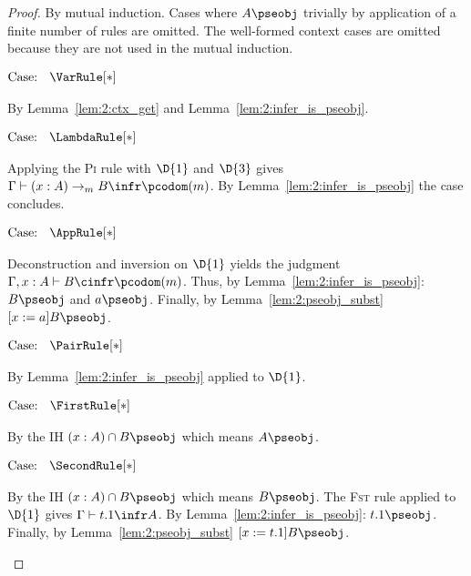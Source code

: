 \begin{proof}
    By mutual induction.
    Cases where $A\pseobj$ trivially by application of a finite number of rules are omitted.
    The well-formed context cases are omitted because they are not used in the mutual induction.

    $\text{Case: }\begin{array}{c} \VarRule[*] \end{array}$
    \begin{proofcase}
        By Lemma~\ref{lem:2:ctx_get} and Lemma~\ref{lem:2:infer_is_pseobj}.
    \end{proofcase}

    $\text{Case: }\begin{array}{c} \LambdaRule[*] \end{array}$
    \begin{proofcase}
        Applying the \textsc{Pi} rule with $\D{1}$ and $\D{3}$ gives $\Gamma \vdash (x : A) \to_m B \infr \pcodom(m)$.
        By Lemma~\ref{lem:2:infer_is_pseobj} the case concludes.
    \end{proofcase}

    $\text{Case: }\begin{array}{c} \AppRule[*] \end{array}$
    \begin{proofcase}
        Deconstruction and inversion on $\D{1}$ yields the judgment $\Gamma, x : A \vdash B \cinfr \pcodom(m)$.
        Thus, by Lemma~\ref{lem:2:infer_is_pseobj}: $B\pseobj$ and $a\pseobj$.
        Finally, by Lemma~\ref{lem:2:pseobj_subst} $[x := a]B\pseobj$.
    \end{proofcase}

    $\text{Case: }\begin{array}{c} \PairRule[*] \end{array}$
    \begin{proofcase}
        By Lemma~\ref{lem:2:infer_is_pseobj} applied to $\D{1}$.
    \end{proofcase}

    $\text{Case: }\begin{array}{c} \FirstRule[*] \end{array}$
    \begin{proofcase}
        By the IH $(x : A) \cap B \pseobj$ which means $A\pseobj$.
    \end{proofcase}

    $\text{Case: }\begin{array}{c} \SecondRule[*] \end{array}$
    \begin{proofcase}
        By the IH $(x : A) \cap B \pseobj$ which means $B\pseobj$.
        The \textsc{Fst} rule applied to $\D{1}$ gives $\Gamma \vdash t.1 \infr A$.
        By Lemma~\ref{lem:2:infer_is_pseobj}: $t.1\pseobj$.
        Finally, by Lemma~\ref{lem:2:pseobj_subst} $[x := t.1]B\pseobj$.
    \end{proofcase}


\end{proof}
